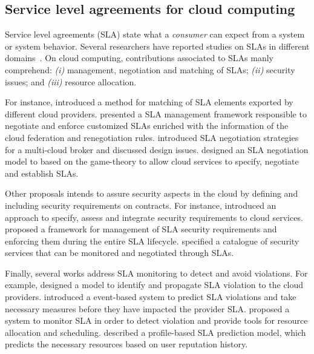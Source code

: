 
\subsection{Service level agreements for cloud computing}
Service level agreements (SLA) state what a \textsl{consumer} can expect from a system or 
system behavior.
Several researchers have reported studies on SLAs in different domains~\cite{AlhamadDC11}.
On cloud computing, contributions associated to SLAs manly comprehend: \textit{(i)} management, 
negotiation and matching of SLAs; \textit{(ii)} security issues; and \textit{(iii)} resource allocation. 

For instance, \cite{Redl2012} introduced a method for matching of SLA elements exported by different cloud providers.
%
\cite{Mavrogeorgi2013} presented a SLA management framework responsible to negotiate and enforce
customized SLAs enriched with the information of the cloud federation and renegotiation rules.
%
\cite{Son2014} introduced SLA negotiation strategies for a multi-cloud broker and discussed
design issues.
%
\cite{Falasi2016} designed an SLA negotiation model to based on the game-theory to allow cloud
services to specify, negotiate and establish SLAs.
%  

Other proposals intends to assure security aspects in the cloud by defining and including
security requirements on contracts. For instance, \cite{rak2013} introduced an approach to specify,
assess and integrate security requirements to cloud services. 
%
\cite{Rojas2016} proposed a framework for management of SLA security requirements and enforcing them
during the entire SLA lifecycle.
%
\cite{Casola2016} specified a catalogue of security services that can be monitored and negotiated through SLAs.

Finally, several works address SLA monitoring to detect and avoid violations.
For example, \cite{Brandic2010} designed a model to identify and propagate
SLA violation to the cloud providers. 
\cite{Leitner2010} introduced a event-based system to predict SLA violations
and take necessary measures before they have impacted the provider SLA.
\cite{Emeakaroha2012} proposed a system to monitor SLA in order to detect violation
and provide tools for resource allocation and scheduling. 
\cite{Hussain2015} described a profile-based SLA prediction model, which predicts
the necessary resources based on user reputation history.
 
